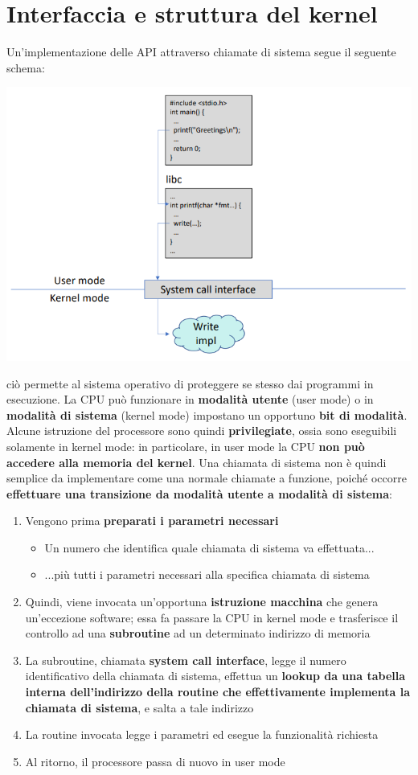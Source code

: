 \documentclass[12pt]{article}
\begin{document}
\section{Interfaccia e struttura del kernel}
Un'implementazione delle API attraverso chiamate di sistema segue il seguente schema:
\begin{center}
    \includegraphics[width = 0.80\linewidth]{Images/33.png}
\end{center}
ciò permette al sistema operativo di proteggere se stesso dai programmi in esecuzione.
La CPU può funzionare in \textbf{modalità utente} (user mode) o in \textbf{modalità di sistema} (kernel mode) impostano un opportuno \textbf{bit di modalità}.
Alcune istruzione del processore sono quindi \textbf{privilegiate}, ossia sono eseguibili solamente in kernel mode: in particolare, in user mode la CPU \textbf{non può accedere alla memoria del kernel}.
Una chiamata di sistema non è quindi semplice da implementare come una normale chiamate a funzione, poiché occorre \textbf{effettuare una transizione da modalità utente a modalità di sistema}:
\begin{enumerate}
    \item Vengono prima \textbf{preparati i parametri necessari}
    \begin{itemize}
        \item Un numero che identifica quale chiamata di sistema va effettuata...
        \item ...più tutti i parametri necessari alla specifica chiamata di sistema
    \end{itemize}
    \item Quindi, viene invocata un'opportuna \textbf{istruzione macchina} che genera un'eccezione software; essa fa passare la CPU in kernel mode e trasferisce il controllo ad una \textbf{subroutine} ad un determinato indirizzo di memoria
    \item La subroutine, chiamata \textbf{system call interface}, legge il numero identificativo della chiamata di sistema, effettua un \textbf{lookup da una tabella interna dell'indirizzo della routine che effettivamente implementa la chiamata di sistema}, e salta a tale indirizzo
    \item La routine invocata legge i parametri ed esegue la funzionalità richiesta
    \item Al ritorno, il processore passa di nuovo in user mode
\end{enumerate}
\end{document}
